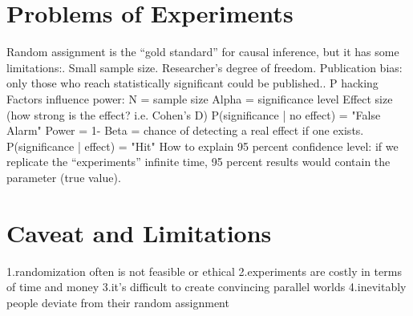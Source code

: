 
\section{Problems of Experiments}
Random assignment is the “gold standard” for causal inference, but it has some limitations:. Small sample size. Researcher’s degree of freedom. Publication bias: only those who reach statistically significant could be published.. P hacking\newline 
\newline 
Factors influence power: \newline
N = sample size\newline
Alpha = significance level\newline  
Effect size (how strong is the effect? i.e. Cohen's D)\newline
P(significance | no effect) = "False Alarm"\newline
Power = 1- Beta = chance of detecting a real effect if one exists.\newline 
P(significance | effect) = "Hit"\newline
\newline
How to explain 95 percent confidence level: \newline
if we replicate the “experiments” infinite time, 95 percent results would contain the parameter (true value). 
\newline
\newline


\section{Caveat and Limitations}
1.randomization often is not feasible or ethical\newline
2.experiments are costly in terms of time and money\newline
3.it’s difficult to create convincing parallel worlds\newline
4.inevitably people deviate from their random assignment\newline
\newline

